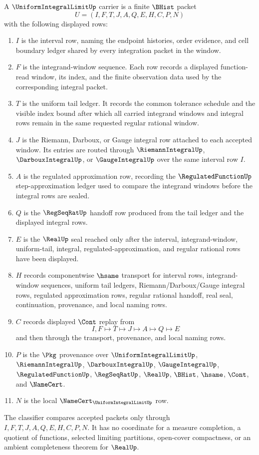 \begin{definition}
\label{def:uniform-integral-limit-carrier}
A $\UniformIntegralLimitUp$ carrier is a finite $\BHist$ packet
$$
U=(I,F,T,J,A,Q,E,H,C,P,N)
$$
with the following displayed rows:
\begin{enumerate}
\item $I$ is the interval row, naming the endpoint histories, order evidence, and cell boundary ledger shared by every integration packet in the window.
\item $F$ is the integrand-window sequence. Each row records a displayed function-read window, its index, and the finite observation data used by the corresponding integral packet.
\item $T$ is the uniform tail ledger. It records the common tolerance schedule and the visible index bound after which all carried integrand windows and integral rows remain in the same requested regular rational window.
\item $J$ is the Riemann, Darboux, or Gauge integral row attached to each accepted window. Its entries are routed through $\RiemannIntegralUp$, $\DarbouxIntegralUp$, or $\GaugeIntegralUp$ over the same interval row $I$.
\item $A$ is the regulated approximation row, recording the $\RegulatedFunctionUp$ step-approximation ledger used to compare the integrand windows before the integral rows are sealed.
\item $Q$ is the $\RegSeqRatUp$ handoff row produced from the tail ledger and the displayed integral rows.
\item $E$ is the $\RealUp$ seal reached only after the interval, integrand-window, uniform-tail, integral, regulated-approximation, and regular rational rows have been displayed.
\item $H$ records componentwise $\hsame$ transport for interval rows, integrand-window sequences, uniform tail ledgers, Riemann/Darboux/Gauge integral rows, regulated approximation rows, regular rational handoff, real seal, continuation, provenance, and local naming rows.
\item $C$ records displayed $\Cont$ replay from
$$
I,F \longmapsto T \longmapsto J \longmapsto A \longmapsto Q \longmapsto E
$$
and then through the transport, provenance, and local naming rows.
\item $P$ is the $\Pkg$ provenance over $\UniformIntegralLimitUp$, $\RiemannIntegralUp$, $\DarbouxIntegralUp$, $\GaugeIntegralUp$, $\RegulatedFunctionUp$, $\RegSeqRatUp$, $\RealUp$, $\BHist$, $\hsame$, $\Cont$, and $\NameCert$.
\item $N$ is the local $\NameCert_{\UniformIntegralLimitUp}$ row.
\end{enumerate}
The classifier compares accepted packets only through $I,F,T,J,A,Q,E,H,C,P,N$. It has no coordinate for a measure completion, a quotient of functions, selected limiting partitions, open-cover compactness, or an ambient completeness theorem for $\RealUp$.
\end{definition}


